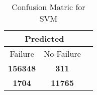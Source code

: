 \begin{table}[] 
\caption{Confusion Matric for SVM} 
\label{Table: Prediction Accuracy-NoneSVM100.0EKF-ignoreReflection-Reflection} 
\centering 
\begin{tabular} 
 {@{}ccc@{}} 
\toprule 
\multicolumn{2}{c}{\textbf{Predicted}}
 \\ \midrule 
\multicolumn{1}{|c|}{Failure} & 
\multicolumn{1}{c|}{No Failure}
 \\ \midrule 
\multicolumn{1}{|c|}{\color{green}\textbf{156348}} & 
\multicolumn{1}{c|}{\color{red}\textbf{311}}
 \\ \midrule 
\multicolumn{1}{|c|}{\color{red}\textbf{1704}} & 
\multicolumn{1}{c|}{\color{green}\textbf{11765}}
 \\ \bottomrule 
\end{tabular} 
\end{table} 

